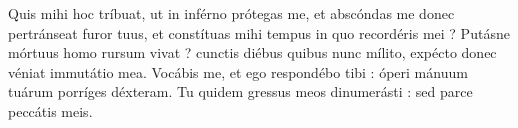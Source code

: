 
Quis mihi hoc tríbuat, ut in inférno prótegas me, et abscóndas me donec pertránseat furor tuus, et constítuas mihi tempus in quo recordéris mei ?
Putásne mórtuus homo rursum vivat ? cunctis diébus quibus nunc mílito, expécto donec véniat immutátio mea.
Vocábis me, et ego respondébo tibi : óperi mánuum tuárum porríges déxteram.
Tu quidem gressus meos dinumerásti : sed parce peccátis meis.
